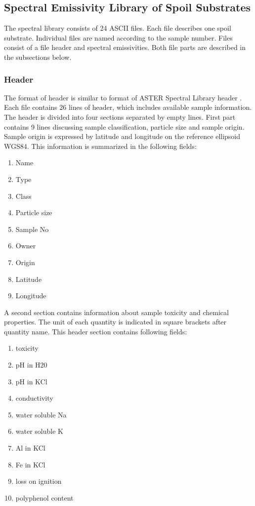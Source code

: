\begin{appendices}

\chapter{Spectral Emissivity Library of Spoil Substrates}
\label{chap:OSTESValid}

The spectral library consists of 24 ASCII files. Each file describes one spoil substrate. Individual files are named according to the sample number. Files consist of a file header and spectral emissivities. Both file parts are described in the subsections below.

\subsection{Header}

The format of header is similar to format of ASTER Spectral Library header \cite{BH09}. Each file contains 26 lines of header, which includes available sample information. The header is divided into four sections separated by empty lines. First part contains 9 lines discussing sample classification, particle size and sample origin. Sample origin is expressed by latitude and longitude on the reference ellipsoid WGS84. This information is summarized in the following fields:

\begin{enumerate}
	\item	Name
	\item Type
	\item Class
	\item Particle size
	\item Sample No
	\item Owner
	\item Origin
	\item Latitude
	\item Longitude
\end{enumerate}

A second section contains information about sample toxicity and chemical properties. The unit of each quantity is indicated in square brackets after quantity name. This header section contains following fields:

\begin{enumerate}
	\item toxicity
	\item pH in H20
	\item pH in KCl
	\item conductivity
	\item water soluble Na
	\item water soluble K
	\item Al in KCl
	\item Fe in KCl
	\item loss on ignition
	\item polyphenol content
\end{enumerate}


\end{appendices}
